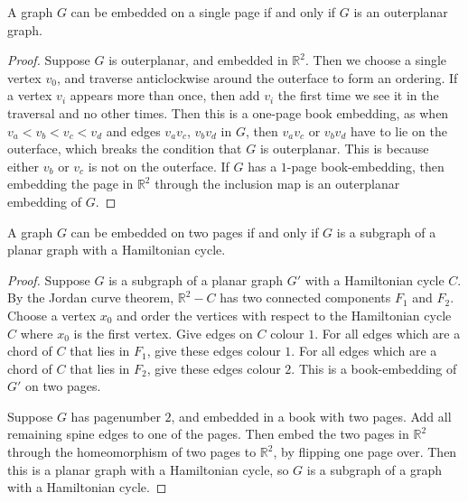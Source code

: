 \begin{proposition}\label{lem:Pagenumber_1}
	A graph \(G\) can be embedded on a single page if and only if \(G\) is an outerplanar graph.
\end{proposition}
\begin{proof}
	Suppose $G$ is outerplanar, and embedded in $\mathbb{R}^2$. Then we choose a single vertex $v_0$, and traverse anticlockwise around the outerface to form an ordering. If a vertex $v_i$ appears more than once, then add $v_i$ the first time we see it in the traversal and no other times. Then this is a one-page book embedding, as when $v_a < v_b < v_c < v_d$ and edges $v_a v_c$, $v_b v_d$ in $G$, then $v_a v_c$ or $v_b v_d$ have to lie on the outerface, which breaks the condition that $G$ is outerplanar. This is because either $v_b$ or $v_c$ is not on the outerface. If $G$ has a $1$-page book-embedding, then embedding the page in $\mathbb{R}^2$ through the inclusion map is an outerplanar embedding of $G$. 
\end{proof}
\begin{proposition}\label{lem:Pagenumber_2}
	A graph \(G\) can be embedded on two pages if and only if \(G\) is a subgraph of a planar graph with a Hamiltonian cycle.
\end{proposition}

\begin{proof}
	Suppose $G$ is a subgraph of a planar graph $G'$ with a Hamiltonian cycle $C$. By the Jordan curve theorem, $\mathbb{R}^2 - C$ has two connected components $F_1$ and $F_2$. Choose a vertex $x_0$ and order the vertices with respect to the Hamiltonian cycle $C$ where $x_0$ is the first vertex. Give edges on $C$ colour $1$. For all edges which are a chord of $C$ that lies in $F_1$, give these edges colour $1$. For all edges which are a chord of $C$ that lies in $F_2$, give these edges colour $2$. This is a book-embedding of $G'$ on two pages. 
	\par
	Suppose $G$ has pagenumber $2$, and embedded in a book with two pages. Add all remaining spine edges to one of the pages. Then embed the two pages in $\mathbb{R}^2$ through the homeomorphism of two pages to $\mathbb{R}^2$, by flipping one page over. Then this is a planar graph with a Hamiltonian cycle, so $G$ is a subgraph of a graph with a Hamiltonian cycle.
\end{proof}
